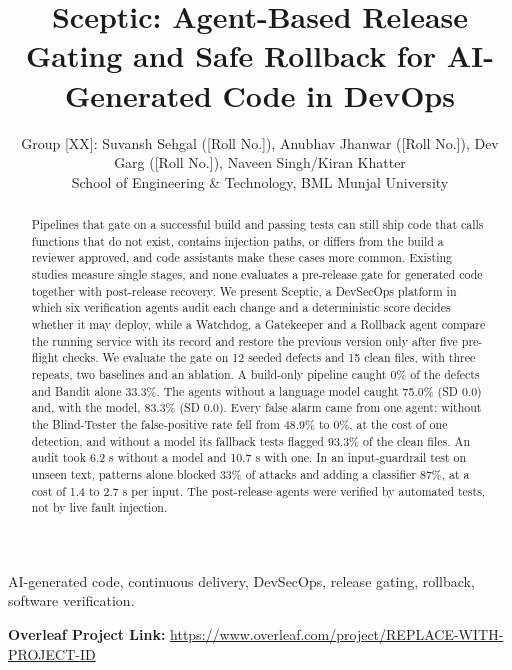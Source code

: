 \documentclass[12pt,onecolumn,draftclsnofoot]{IEEEtran}
\begin{document}
\title{Sceptic: Agent-Based Release Gating and Safe Rollback for AI-Generated Code in DevOps}
\author{Group [XX]: Suvansh Sehgal ([Roll No.]), Anubhav Jhanwar ([Roll No.]), Dev Garg ([Roll No.]), Naveen Singh/Kiran Khatter\\
School of Engineering \& Technology, BML Munjal University}
\maketitle
\begin{abstract}
Pipelines that gate on a successful build and passing tests can still ship code that calls functions that do not exist, contains injection paths, or differs from the build a reviewer approved, and code assistants make these cases more common. Existing studies measure single stages, and none evaluates a pre-release gate for generated code together with post-release recovery. We present Sceptic, a DevSecOps platform in which six verification agents audit each change and a deterministic score decides whether it may deploy, while a Watchdog, a Gatekeeper and a Rollback agent compare the running service with its record and restore the previous version only after five pre-flight checks. We evaluate the gate on 12 seeded defects and 15 clean files, with three repeats, two baselines and an ablation. A build-only pipeline caught 0\% of the defects and Bandit alone 33.3\%. The agents without a language model caught 75.0\% (SD 0.0) and, with the model, 83.3\% (SD 0.0). Every false alarm came from one agent: without the Blind-Tester the false-positive rate fell from 48.9\% to 0\%, at the cost of one detection, and without a model its fallback tests flagged 93.3\% of the clean files. An audit took 6.2 s without a model and 10.7 s with one. In an input-guardrail test on unseen text, patterns alone blocked 33\% of attacks and adding a classifier 87\%, at a cost of 1.4 to 2.7 s per input. The post-release agents were verified by automated tests, not by live fault injection.
\end{abstract}
\begin{IEEEkeywords}
AI-generated code, continuous delivery, DevSecOps, release gating, rollback, software verification.
\end{IEEEkeywords}
\noindent\textbf{Overleaf Project Link:} \url{https://www.overleaf.com/project/REPLACE-WITH-PROJECT-ID}
\end{document}
